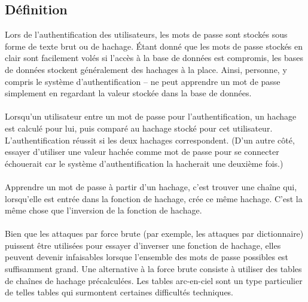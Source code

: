 \documentclass[12pt, oneside]{article}
\begin{document}
\subsection{Définition}
Lors de l'authentification des utilisateurs, les mots de passe sont stockés sous forme de texte brut ou de hachage. Étant donné que les mots de passe stockés en clair sont facilement volés si l'accès à la base de données est compromis, les bases de données stockent généralement des hachages à la place. Ainsi, personne, y compris le système d'authentification – ne peut apprendre un mot de passe simplement en regardant la valeur stockée dans la base de données. \\\\Lorsqu'un utilisateur entre un mot de passe pour l'authentification, un hachage est calculé pour lui, puis comparé au hachage stocké pour cet utilisateur. L'authentification réussit si les deux hachages correspondent. (D'un autre côté, essayer d'utiliser une valeur hachée comme mot de passe pour se connecter échouerait car le système d'authentification la hacherait une deuxième fois.) \\\\Apprendre un mot de passe à partir d'un hachage, c'est trouver une chaîne qui, lorsqu'elle est entrée dans la fonction de hachage, crée ce même hachage. C'est la même chose que l'inversion de la fonction de hachage.\\\\Bien que les attaques par force brute (par exemple, les attaques par dictionnaire) puissent être utilisées pour essayer d'inverser une fonction de hachage, elles peuvent devenir infaisables lorsque l'ensemble des mots de passe possibles est suffisamment grand. Une alternative à la force brute consiste à utiliser des tables de chaînes de hachage précalculées. Les tables arc-en-ciel sont un type particulier de telles tables qui surmontent certaines difficultés techniques.
\end{document}

